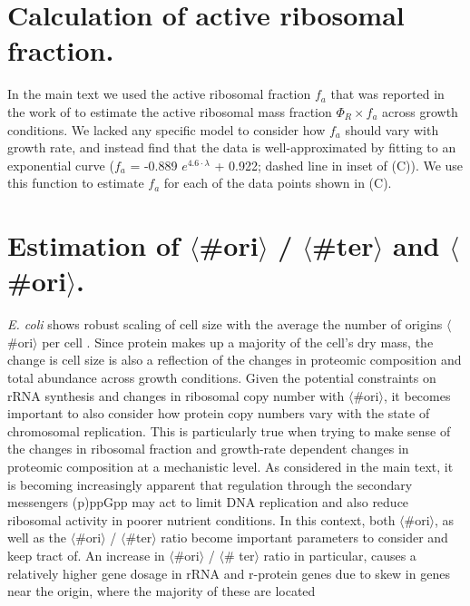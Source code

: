 
\section{Calculation of active ribosomal fraction.}
\label{sec:SI_f_a}
In the main text we used the active ribosomal fraction $f_a$ that was reported
in the work of \cite{dai2016} to estimate the active ribosomal mass fraction
$\Phi_R \times f_a$ across growth conditions. We lacked any specific model to
consider how  $f_a$ should vary with growth rate, and instead find that the data
is well-approximated by fitting to an exponential curve ($f_a$ = -0.889 $e^{4.6
\cdot \lambda}$ + 0.922; dashed line in inset of (C)). We
use this function to estimate $f_a$ for each of the data points shown in
(C).

\section{Estimation of $\langle$\#ori$\rangle$ / $\langle$\#ter$\rangle$ and $\langle$\#ori$\rangle$.}
\label{sec:SI_ori}
\textit{E. coli} shows robust scaling of cell size with the average the number
of origins $\langle$\#ori$\rangle$ per cell \citep{si2017}. Since protein makes
up a  majority of the cell's dry mass, the change is cell size is also a
reflection of the changes in proteomic composition and total abundance across
growth conditions. Given the potential constraints on rRNA synthesis and changes
in ribosomal copy number with $\langle$\#ori$\rangle$, it becomes important to
also consider how protein copy numbers vary with the state of chromosomal
replication. This is particularly true  when trying to make sense of the changes
in ribosomal fraction and growth-rate dependent changes in proteomic composition
at a  mechanistic level.  As considered in the main text, it is becoming
increasingly apparent that regulation through the secondary messengers (p)ppGpp
may act to limit DNA replication and also reduce ribosomal activity in poorer
nutrient conditions.  In this context, both $\langle$\#ori$\rangle$, as well as
the $\langle$\#ori$\rangle$ / $\langle$\#ter$\rangle$ ratio become important
parameters to consider and keep tract of. An increase in $\langle$\#ori$\rangle$
/ $\langle$\# ter$\rangle$ ratio  in particular, causes a relatively higher gene
dosage in rRNA and r-protein genes due to skew in genes near the origin, where
the majority of these are located


